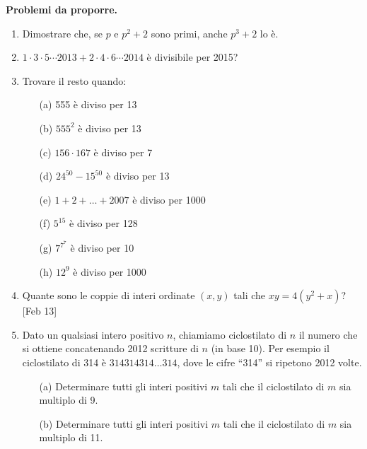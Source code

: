 \documentclass[a4paper]{article}
\theoremstyle{remark}
\theoremstyle{definition}
\begin{document}
\textbf{Problemi da proporre.}
\begin{multicols}{2}
	\begin{enumerate}
		\item Dimostrare che, se $ p $ e $ p^2 +2 $ sono primi, anche $ p^3 +2 $ lo è.
		
		\item $  1 \cdot 3 \cdot 5 \cdots 2013 + 2 \cdot 4 \cdot 6 \cdots 2014  $ è divisibile per 2015?
		
		\item Trovare il resto quando:
		\begin{itemize}
			\item [(a)] 555 è diviso per 13 \\
			\item [(b)] $ 555^2$ è diviso per 13\\
			\item [(c)] $ 156 \cdot 167 $ è diviso per 7 \\
			\item [(d)] $ 24^{50} - 15^{50} $ è diviso per 13\\
			\item [(e)] $ 1 + 2 + \dots + 2007 $ è diviso per 1000\\
			\item [(f)] $ 5^{15} $ è diviso per 128\\
			\item [(g)]$  7^{7^7} $ è diviso per 10\\
			\item [(h)] $ 12^9 $ è diviso per 1000\\
		\end{itemize}
		
		
		\item Quante sono le coppie di interi ordinate $ (x, y) $ tali che $ xy = 4(y^2 + x) $? [Feb 13] \\
		
		\item Dato un qualsiasi intero positivo $ n $, chiamiamo ciclostilato di $ n $ il numero che si ottiene concatenando 2012 scritture di $ n $ (in base 10). Per esempio il ciclostilato di 314 è $ 314314314\dots314 $, dove le cifre “314” si ripetono 2012 volte.
		\begin{itemize}
			\item [(a)] Determinare tutti gli interi positivi $ m $ tali che il ciclostilato di $ m $ sia multiplo di 9.
			\item [(b)] Determinare tutti gli interi positivi $ m $ tali che il ciclostilato di $ m $ sia multiplo di 11.
		\end{itemize}
	

\end{enumerate}
\end{multicols}
\end{document}
